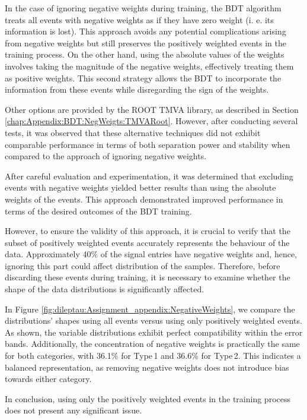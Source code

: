 In the case of ignoring negative weights during training, the BDT algorithm treats all 
events with negative weights as if they have zero weight (i. e. its information is lost). 
This approach avoids any potential complications arising from negative weights but 
still preserves the positively weighted events in the training process. On the other hand, 
using the absolute values of the weights involves taking the magnitude of the negative weights, 
effectively treating them as positive weights. This second strategy allows the BDT to 
incorporate the information from these events while disregarding the sign of the weights.

Other options are provided by the ROOT TMVA library, as described in Section
\ref{chap:Appendix:BDT:NegWeigts:TMVARoot}. However, after conducting several tests, 
it was observed that these alternative techniques did not exhibit comparable performance 
in terms of both separation power and stability when compared to the approach of ignoring 
negative weights.

After careful evaluation and experimentation, it was determined that excluding events with 
negative weights yielded better results than using the absolute weights of the events. This 
approach demonstrated improved performance in terms of the desired outcomes of the BDT training.

However, to ensure the validity of this approach, it is crucial to verify that the subset of positively 
weighted events accurately represents the behaviour of the data. Approximately 40\% of the signal 
entries have negative weights and, hence, ignoring this part could affect distribution of the samples. 
Therefore, before discarding these events during training, it is necessary to examine whether the 
shape of the data distributions is significantly affected.

In Figure \ref{fig:dileptau:Assignment_appendix:NegativeWeights}, we compare the distributions' shapes 
using all events versus using only positively weighted events. As shown, the variable distributions exhibit 
perfect compatibility within the error bands. Additionally, the concentration of negative weights is practically 
the same for both categories, with 36.1\% for  Type$\,$1 and 36.6\% for Type$\,$2. This indicates a balanced
 representation, as removing negative weights does not introduce bias towards either category.

In conclusion, using only the positively weighted events in the training 
process does not present any significant issue.

